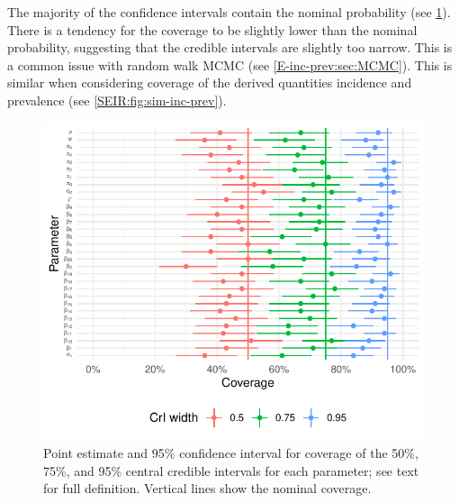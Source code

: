 \documentclass[thesis.tex]{subfiles}
\begin{document}
The majority of the confidence intervals contain the nominal probability (see \cref{SEIR:fig:sim-coverage}).
There is a tendency for the coverage to be slightly lower than the nominal probability, suggesting that the credible intervals are slightly too narrow.
This is a common issue with random walk MCMC (see \cref{E-inc-prev:sec:MCMC}).
This is similar when considering coverage of the derived quantities incidence and prevalence (see \cref{SEIR:fig:sim-inc-prev}).
\begin{figure}
    \includegraphics{SEIR/sim/coverage}
    \caption[Coverage of simulation study]{%
        Point estimate and 95\% confidence interval for coverage of the 50\%, 75\%, and 95\% central credible intervals for each parameter; see text for full definition.
        Vertical lines show the nominal coverage.
    }
    \label{SEIR:fig:sim-coverage}
\end{figure}
\end{document}
